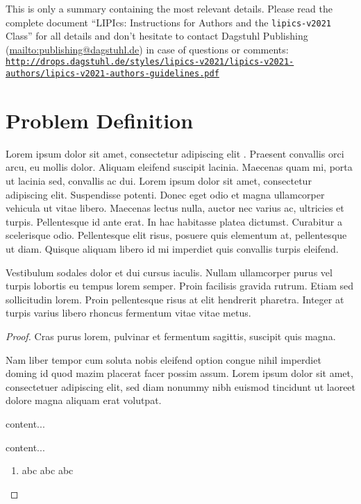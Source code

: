 \documentclass[a4paper,UKenglish,cleveref, autoref, thm-restate]{lipics-v2021}
\begin{document}
\enlargethispage{\baselineskip}

This is only a summary containing the most relevant details. Please read the complete document ``LIPIcs: Instructions for Authors and the \texttt{lipics-v2021} Class'' for all details and don't hesitate to contact Dagstuhl Publishing (\url{mailto:publishing@dagstuhl.de}) in case of questions or comments:
\href{http://drops.dagstuhl.de/styles/lipics-v2021/lipics-v2021-authors/lipics-v2021-authors-guidelines.pdf}{\texttt{http://drops.dagstuhl.de/styles/lipics-v2021/\newline lipics-v2021-authors/lipics-v2021-authors-guidelines.pdf}}

\section{Problem Definition}

Lorem ipsum dolor sit amet, consectetur adipiscing elit \cite{DBLP:journals/cacm/Knuth74}. Praesent convallis orci arcu, eu mollis dolor. Aliquam eleifend suscipit lacinia. Maecenas quam mi, porta ut lacinia sed, convallis ac dui. Lorem ipsum dolor sit amet, consectetur adipiscing elit. Suspendisse potenti. Donec eget odio et magna ullamcorper vehicula ut vitae libero. Maecenas lectus nulla, auctor nec varius ac, ultricies et turpis. Pellentesque id ante erat. In hac habitasse platea dictumst. Curabitur a scelerisque odio. Pellentesque elit risus, posuere quis elementum at, pellentesque ut diam. Quisque aliquam libero id mi imperdiet quis convallis turpis eleifend. 

\begin{lemma}
\label{lemma:lorem}
Vestibulum sodales dolor et dui cursus iaculis. Nullam ullamcorper purus vel turpis lobortis eu tempus lorem semper. Proin facilisis gravida rutrum. Etiam sed sollicitudin lorem. Proin pellentesque risus at elit hendrerit pharetra. Integer at turpis varius libero rhoncus fermentum vitae vitae metus.
\end{lemma}

\begin{proof}
Cras purus lorem, pulvinar et fermentum sagittis, suscipit quis magna.


Nam liber tempor cum soluta nobis eleifend option congue nihil imperdiet doming id quod mazim placerat facer possim assum. Lorem ipsum dolor sit amet, consectetuer adipiscing elit, sed diam nonummy nibh euismod tincidunt ut laoreet dolore magna aliquam erat volutpat.
\begin{claim}
content...
\end{claim}
\begin{claimproof}
content...
    \begin{enumerate}
        \item abc abc abc \claimqedhere{}
    \end{enumerate}
\end{claimproof}

\end{proof}
\end{document}
